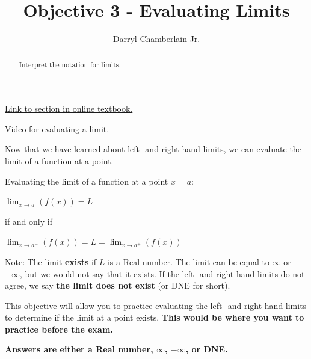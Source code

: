 \documentclass{ximera}
\author{Darryl Chamberlain Jr.}
\title{Objective 3 - Evaluating Limits}
\begin{document}
\begin{abstract}
Interpret the notation for limits.
\end{abstract}
\maketitle
 
\href{https://cnx.org/contents/i4nRcikn@5.1:dKCfyV9u@5/The-Limit-of-a-Function}{Link to section in online textbook.}

\href{https://www.youtube.com/watch?v=riXcZT2ICjA}{Video for evaluating a limit.}
 

Now that we have learned about left- and right-hand limits, we can evaluate the limit of a function at a point. 

\begin{theorem}
	Evaluating the limit of a function at a point $x=a$:
	\begin{center}
		
		$\lim_{x \rightarrow a} (f(x)) = L$ 
		
		if and only if 
		
		$\lim_{x \rightarrow a^{-}} (f(x)) = L = \lim_{x \rightarrow a^{+}} (f(x))$ 
	\end{center}
	
	Note: The limit \textbf{exists} if $L$ is a Real number. The limit can be equal to $\infty$ or $-\infty$, but we would not say that it exists. If the left- and right-hand limits do not agree, we say \textbf{the limit does not exist} (or DNE for short).
\end{theorem}

This objective will allow you to practice evaluating the left- and right-hand limits to determine if the limit at a point exists. \textbf{This would be where you want to practice before the exam.}

\textbf{Answers are either a Real number, $\infty$, $-\infty$, or DNE.}
\end{document}
